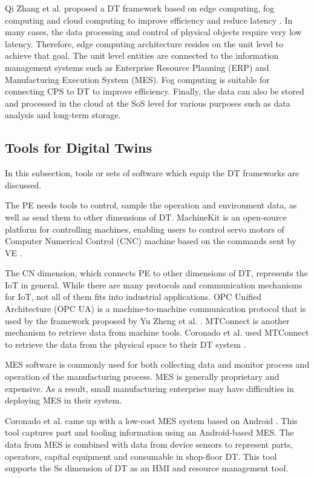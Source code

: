 \documentclass[article,table]{aaltoseries}
\begin{document}
Qi Zhang et al. proposed a DT framework based on edge computing, fog computing and cloud computing to improve efficiency and reduce latency \cite{qi2018modeling}. In many cases, the data processing and control of physical objects require very low latency. Therefore, edge computing architecture resides on the unit level to achieve that goal. The unit level entities are connected to the information management systems such as Enterprise Resource Planning (ERP) and Manufacturing Execution System (MES). Fog computing is suitable for connecting CPS to DT to improve efficiency. Finally, the data can also be stored and processed in the cloud at the SoS level for various purposes such as data analysis and long-term storage.

\subsection{Tools for Digital Twins}
In this subsection, tools or sets of software which equip the DT frameworks are discussed. 

The PE needs tools to control, sample the operation and environment data, as well as send them to other dimensions of DT. MachineKit is an open-source platform for controlling machines, enabling users to control servo motors of Computer Numerical Control (CNC) machine based on the commands sent by VE \cite{lynn2018realization}.

The CN dimension, which connects PE to other dimensions of DT, represents the IoT in general. While there are many protocols and communication mechanisms for IoT, not all of them fits into industrial applications. OPC Unified Architecture (OPC UA) is a machine-to-machine communication protocol that is used by the framework proposed by Yu Zheng et al. \cite{zheng2019application}. MTConnect is another mechanism to retrieve data from machine tools. Coronado et al. used MTConnect to retrieve the data from the physical space to their DT system \cite{UrbinaCoronado2018}.

MES software is commonly used for both collecting data and monitor process and operation of the manufacturing process. MES is generally proprietary and expensive. As a result, small manufacturing enterprise may have difficulties in deploying MES in their system.

Coronado et al. came up with a low-cost MES system based on Android \cite{UrbinaCoronado2018}. This tool captures part and tooling information using an Android-based MES. The data from MES is combined with data from device sensors to represent parts, operators, capital equipment and consumable in shop-floor DT. This tool supports the Ss dimension of DT as an HMI and resource management tool.
\end{document}
